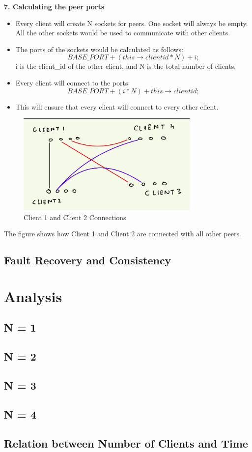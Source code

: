 \documentclass[12pt]{scrartcl}
\begin{document}
\textbf{7. Calculating the peer ports}

\begin{itemize}
    \item Every client will create N sockets for peers. One socket will always be empty. All the other sockets would be used to communicate with other clients.
    \item The ports of the sockets would be calculated as follows: $$BASE\_PORT + (this\rightarrow clientid * N) + i;$$
    i is the client\_id of the other client, and N is the total number of clients.
    \item Every client will connect to the ports:  $$BASE\_PORT + (i * N) + this\rightarrow clientid;$$
    \item This will ensure that every client will connect to every other client.
\end{itemize}
\begin{figure}[H]
    \centering
    \includegraphics[width=0.8\textwidth]{images/Screenshot from 2023-09-05 11-44-09.png}
    \caption{Client 1 and Client 2 Connections}
    \label{fig:my_label}
\end{figure}

\par The figure shows how Client 1 and Client 2 are connected with all other peers.\\

\subsection{Fault Recovery and Consistency}
\section{Analysis}
\subsection{N = 1}
\subsection{N = 2}
\subsection{N = 3}
\subsection{N = 4}
\subsection{Relation between Number of Clients and Time}
\end{document}
